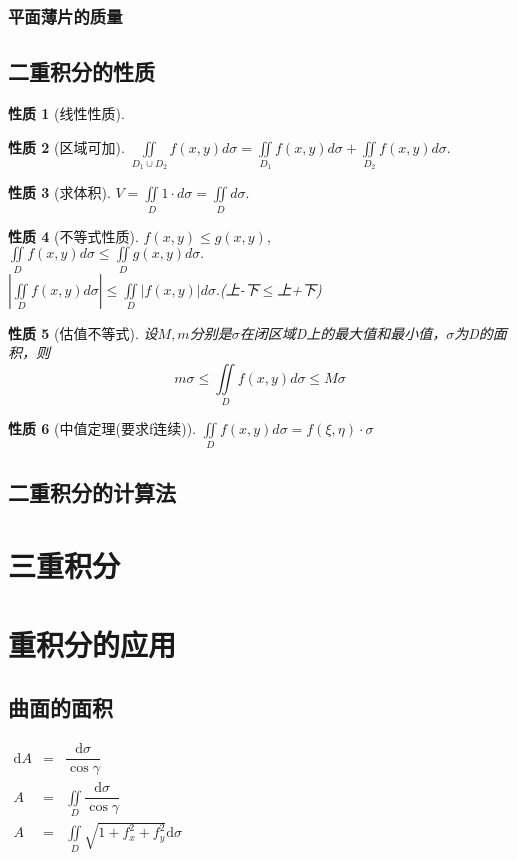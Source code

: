 \documentclass[UTF8,a4paper,12pt,scheme=chinese]{ctexbook}
\newcommand{\ud}{\mathrm{d}}
\theoremstyle{plain}
\newtheorem{property}{性质}[subsection]
\begin{document}
	\subsubsection{平面薄片的质量}
	\subsection{二重积分的性质}
	\begin{property}[线性性质]
	\end{property}
	\begin{property}[区域可加]
		$\iint\limits_{{D_1} \cup {D_2}} {f(x,y)d\sigma } = \iint\limits_{{D_1}} {f(x,y)d\sigma } + \iint\limits_{{D_2}} {f(x,y)d\sigma }.$
	\end{property}
	\begin{property}[求体积]
		$V  = \iint\limits_D {1 \cdot d\sigma  = \iint\limits_D {d\sigma }}.$
	\end{property}
	\begin{property}[不等式性质]
		$f(x,y) \leqslant g(x,y),$\\
		$\iint\limits_D {f(x,y)d\sigma  \leqslant }\iint\limits_D {g(x,y)d\sigma }.$\\
		$\left| {\iint\limits_D {f(x,y)d\sigma }} \right| \leqslant \iint\limits_D {\left| {f(x,y)} \right|d\sigma }.$\quad(上-下$ \leqslant $上+下)
	\end{property}
	\begin{property}[估值不等式]
		设$ M,m $分别是$ \sigma $在闭区域D上的最大值和最小值，$ \sigma $为D的面积，则\\
		\[ m\sigma  \leqslant \iint\limits_D {f(x,y)d\sigma  \leqslant M\sigma } \]
	\end{property}
	\begin{property}[中值定理(要求f连续)]
		$\iint\limits_D {f(x,y)d\sigma } = f(\xi ,\eta ) \cdot \sigma $
	\end{property}
	\subsection{二重积分的计算法}
	\section{三重积分}
	\section{重积分的应用}
	\subsection{曲面的面积}
	$
	\begin{array}{rcll}
		\ud A &=& \dfrac{\ud\sigma}{\cos\gamma}\\
		A &=& \iint\limits_D \dfrac{\ud\sigma}{\cos\gamma}\\
		A &=& \iint\limits_D {\sqrt {1 + f_x^2 + f_y^2} \ud\sigma }
	\end{array}
	$
\end{document}
